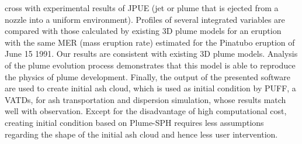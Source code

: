 cross with experimental results of JPUE (jet or plume that is ejected from a nozzle into a uniform environment). 
Profiles of several integrated variables are compared with those calculated by existing 3D plume models for an eruption with the same MER (mass eruption rate) estimated for the Pinatubo eruption of June 15 1991. Our results are consistent with existing 3D plume models. Analysis of the plume evolution process demonstrates that this model is able to reproduce the physics of plume development. Finally, the output of the presented software are used to create initial ash cloud, which is used as initial condition by PUFF, a VATDs, for ash transportation and dispersion simulation, whose results match well with observation. Except for the disadvantage of high computational cost, creating initial condition based on Plume-SPH requires less assumptions regarding the shape of the initial ash cloud and hence less user intervention. 